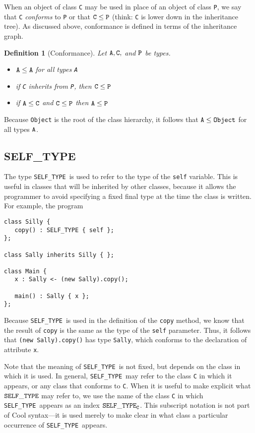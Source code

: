 \documentclass[11pt]{article}
\newtheorem{definition}[theorem]{Definition}
\newcommand{\styp}{{\tt SELF\_TYPE}}
\begin{document}
When an object of class {\tt C} may be used in place of an object of class
{\tt P}, we say that {\tt C} {\em conforms} to {\tt P} or that
$\tt C \leq P$ (think: {\tt C} is lower down in the inheritance tree). 
As discussed above,
conformance is defined in terms of the inheritance graph.
\begin{definition}[Conformance]
\label{def-conforms}
\rm
Let $\tt A,C,$ and $\tt P$ be types.
\begin{itemize}
\item $\tt A \leq A$ for all types {\tt A}

\item if {\tt C} inherits from {\tt P}, then $\tt C \leq P$

\item if $\tt A \leq C$ and $\tt C \leq P$ then $\tt A \leq P$

\end{itemize}
\end{definition}

Because {\tt Object} is the root of the class hierarchy, it follows that
$\tt A \leq Object$ for all types $\tt A$.

\subsection{SELF\_TYPE}

The type \styp\ is used to refer to the type of the {\tt self}
variable.  This is useful in classes that will be inherited by other
classes, because it allows the programmer to avoid specifying
a fixed final type at the time the class is written.  For example,
the program
\begin{verbatim}
class Silly {
   copy() : SELF_TYPE { self };
};

class Sally inherits Silly { };

class Main {
   x : Sally <- (new Sally).copy();

   main() : Sally { x };
};
\end{verbatim}
Because \styp\ is used in the definition of the {\tt copy} method,
we know that the result of {\tt copy} is  the same as the 
type of the {\tt self}
parameter.  Thus, it follows that {\tt (new Sally).copy()} has
type {\tt Sally}, which conforms to the declaration of attribute {\tt x}.

Note that the meaning of \styp\ is not fixed, but depends on the class
in which it is used.  In general, \styp\ may refer to the class {\tt C}
in which it appears, or any class that conforms to {\tt C}.  When it is
useful to make explicit what $\styp$ may refer to, we use the 
name of the class {\tt C} in which \styp\ appears as an index $\styp_{\tt C}$.
This subscript notation is not part of Cool syntax---it is used merely
to make clear in what class a particular occurrence of \styp\ appears.
\end{document}
